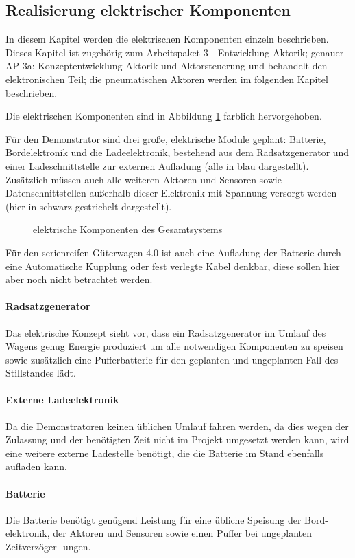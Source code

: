 \subsection{Realisierung elektrischer Komponenten}\label{sec:eKomp}
In diesem Kapitel werden die elektrischen Komponenten einzeln beschrieben. Dieses Kapitel ist zugehörig zum Arbeitspaket 3 - Entwicklung Aktorik; genauer AP 3a: Konzeptentwicklung Aktorik und Aktorsteuerung und behandelt den elektronischen Teil; die pneumatischen Aktoren werden im folgenden Kapitel beschrieben.\par
Die elektrischen Komponenten sind in Abbildung \ref{fig:eKomp} farblich hervorgehoben.\par
Für den Demonstrator sind drei große, elektrische Module geplant: Batterie, Bordelektronik und die Ladeelektronik, bestehend aus dem Radsatzgenerator und einer Ladeschnittstelle zur externen Aufladung (alle in blau dargestellt). Zusätzlich müssen auch alle weiteren Aktoren und Sensoren sowie Datenschnittstellen außerhalb dieser Elektronik mit Spannung versorgt werden (hier in schwarz gestrichelt dargestellt).\par
\begin{figure}[hbt]
    \centering
    
    \caption{elektrische Komponenten des Gesamtsystems}
    \label{fig:eKomp}
\end{figure}
Für den serienreifen Güterwagen 4.0 ist auch eine Aufladung der Batterie durch eine Automatische Kupplung oder fest verlegte Kabel denkbar, diese sollen hier aber noch nicht betrachtet werden.

\paragraph{Radsatzgenerator} \label{sec:RSG}
Das elektrische Konzept sieht vor, dass ein Radsatzgenerator im Umlauf des Wagens genug Energie produziert um alle notwendigen Komponenten zu speisen sowie zusätzlich eine Pufferbatterie für den geplanten und ungeplanten Fall des Stillstandes lädt.
\paragraph{Externe Ladeelektronik}
Da die Demonstratoren keinen üblichen Umlauf fahren werden, da dies wegen der Zulassung und der benötigten Zeit nicht im Projekt umgesetzt werden kann, wird eine weitere externe Ladestelle benötigt, die die Batterie im Stand ebenfalls aufladen kann.
\paragraph{Batterie}\label{sec:Batterie}
Die Batterie benötigt genügend Leistung für eine übliche Speisung der Bord- elektronik, der Aktoren und Sensoren sowie einen Puffer bei ungeplanten Zeitverzöger- ungen.
